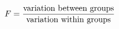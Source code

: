 \documentclass[preview]{standalone}
\begin{document}
\begin{align*}
\special{dvisvgm:raw <g id='unique000'>}F = \frac{\text{variation between groups}}{\text{variation within groups}}\special{dvisvgm:raw </g>}
\end{align*}
\end{document}
